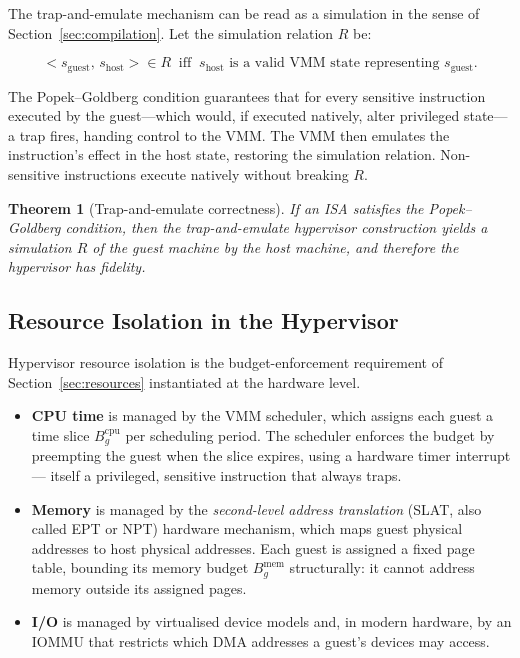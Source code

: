 \documentclass[11pt, a4paper]{article}
\theoremstyle{definition}
\theoremstyle{plain}
\newtheorem{theorem}[definition]{Theorem}
\theoremstyle{remark}
\begin{document}
The trap-and-emulate mechanism can be read as a simulation in the sense of
Section~\ref{sec:compilation}. Let the simulation relation $R$ be:

\[
  <s_{\mathrm{guest}},\, s_{\mathrm{host}}> \in R
  \;\;\text{iff}\;\;
  s_{\mathrm{host}} \text{ is a valid VMM state representing } s_{\mathrm{guest}}.
\]

The Popek--Goldberg condition guarantees that for every sensitive instruction
executed by the guest---which would, if executed natively, alter privileged
state---a trap fires, handing control to the VMM. The VMM then emulates the
instruction's effect in the host state, restoring the simulation relation.
Non-sensitive instructions execute natively without breaking $R$.

\begin{theorem}[Trap-and-emulate correctness]
  If an ISA satisfies the Popek--Goldberg condition, then the trap-and-emulate
  hypervisor construction yields a simulation $R$ of the guest machine by the
  host machine, and therefore the hypervisor has fidelity.
\end{theorem}

\subsection{Resource Isolation in the Hypervisor}

Hypervisor resource isolation is the budget-enforcement requirement of
Section~\ref{sec:resources} instantiated at the hardware level.

\begin{itemize}
  \item \textbf{CPU time} is managed by the VMM scheduler, which assigns
        each guest a time slice $B_g^{\mathrm{cpu}}$ per scheduling period.
        The scheduler enforces the budget by preempting the guest when the
        slice expires, using a hardware timer interrupt --- itself a
        privileged, sensitive instruction that always traps.
  \item \textbf{Memory} is managed by the \emph{second-level address
        translation} (SLAT, also called EPT or NPT) hardware mechanism,
        which maps guest physical addresses to host physical addresses.
        Each guest is assigned a fixed page table, bounding its memory
        budget $B_g^{\mathrm{mem}}$ structurally: it cannot address memory
        outside its assigned pages.
  \item \textbf{I/O} is managed by virtualised device models and, in modern
        hardware, by an IOMMU that restricts which DMA addresses a guest's
        devices may access.
\end{itemize}
\end{document}
